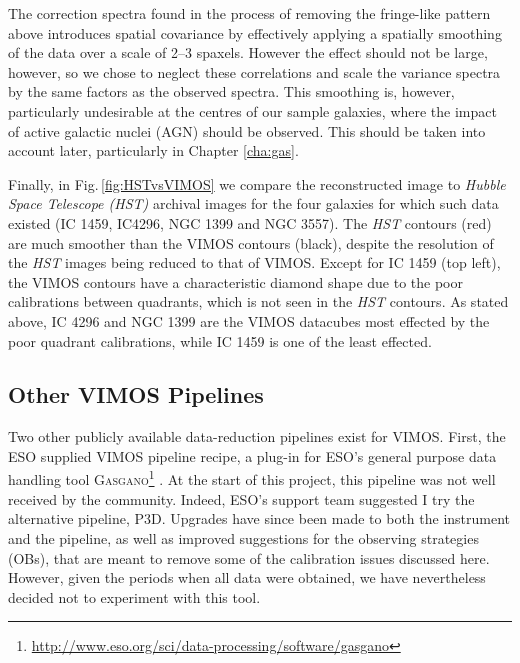 		The correction spectra found in the process of removing the fringe-like pattern above introduces spatial covariance by effectively applying a spatially smoothing of the data over a scale of 2--3 spaxels. However the effect should not be large, however, so we chose to neglect these correlations and scale the variance spectra by the same factors as the observed spectra. This smoothing is, however, particularly undesirable at the centres of our sample galaxies, where the impact of active galactic nuclei (AGN) should be observed. This should be taken into account later, particularly in Chapter \ref{cha:gas}.

		Finally, in Fig.\,\ref{fig:HSTvsVIMOS} we compare the reconstructed image to \textit{Hubble Space Telescope (HST)} archival images for the four galaxies for which such data existed (IC 1459, IC4296, NGC 1399 and NGC 3557). The \textit{HST} contours (red) are much smoother than the VIMOS contours (black), despite the resolution of the \textit{HST} images being reduced to that of VIMOS. Except for IC 1459 (top left), the VIMOS contours have a characteristic diamond shape due to the poor calibrations between quadrants, which is not seen in the \textit{HST} contours. As stated above, IC 4296 and NGC 1399 are the VIMOS datacubes most effected by the poor quadrant calibrations, while IC 1459 is one of the least effected.

		


	\subsection{Other VIMOS Pipelines}
		\label{subsec:Other}
		Two other publicly available data-reduction pipelines exist for VIMOS. First, the ESO supplied VIMOS pipeline recipe, a plug-in for ESO's general purpose data handling tool \textsc{Gasgano}\footnote{\url{http://www.eso.org/sci/data-processing/software/gasgano}} \citep{Izzo2004, ESO2012}. At the start of this project, this pipeline was not well received by the community. Indeed, ESO's support team suggested I try the alternative pipeline, \textsc{P3D}. Upgrades have since been made to both the instrument and the pipeline, as well as improved suggestions for the observing strategies (OBs), that are meant to remove some of the calibration issues discussed here. However, given the periods when all data were obtained, we have nevertheless decided not to experiment with this tool.
		
